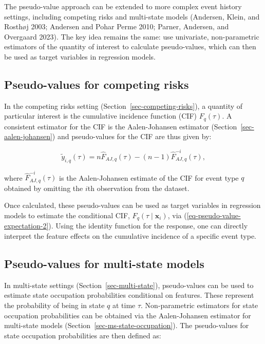 \documentclass[
  letterpaper,
  krantz2]{style/krantz}
\begin{document}
The pseudo-value approach can be extended to more complex event history
settings, including competing risks and multi-state models (Andersen,
Klein, and Rosthøj 2003; Andersen and Pohar Perme 2010; Parner,
Andersen, and Overgaard 2023). The key idea remains the same: use
univariate, non-parametric estimators of the quantity of interest to
calculate pseudo-values, which can then be used as target variables in
regression models.

\subsection{Pseudo-values for competing
risks}\label{sec-pseudo-value-cr}

In the competing risks setting (Section~\ref{sec-competing-risks}), a
quantity of particular interest is the cumulative incidence function
(CIF)
\(F_q(\tau)\).
A consistent estimator for the CIF is the Aalen-Johansen estimator
(Section~\ref{sec-aalen-johansen}) and pseudo-values for the CIF are
thus given by:

\[
\tilde{y}_{i,q}(\tau) = n\hat{F}_{AJ,q}(\tau) - (n-1)\hat{F}_{AJ,q}^{-i}(\tau),
\]

where \(\hat{F}_{AJ,q}^{-i}(\tau)\) is the Aalen-Johansen estimate of
the CIF for event type \(q\) obtained by omitting the \(i\)th
observation from the dataset.

Once calculated, these pseudo-values can be used as target variables in
regression models to estimate the conditional CIF,
\(F_q(\tau \mid \mathbf{x}_i)\), via
(\ref{eq-pseudo-value-expectation-2}). Using the identity function for
the response, one can directly interpret the feature effects on the
cumulative incidence of a specific event type.

\subsection{Pseudo-values for multi-state
models}\label{sec-pseudo-value-occupation-prob}

In multi-state settings (Section~\ref{sec-multi-state}), pseudo-values
can be used to estimate state occupation probabilities conditional on
features.
These represent the probability of being in state \(q\) at time
\(\tau\). Non-parametric estimators for state occupation probabilities
can be obtained via the Aalen-Johansen estimator for multi-state models
(Section~\ref{sec-ms-state-occupation}). The pseudo-values for state
occupation probabilities are then defined as:
\end{document}
